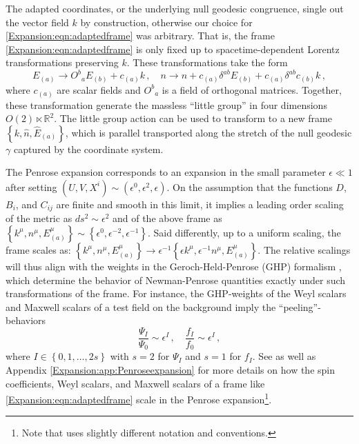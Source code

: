 The adapted coordinates, or the underlying null geodesic congruence, single out the vector field $k$ by construction, otherwise our choice for \eqref{Expansion:eqn:adaptedframe} was arbitrary. That is, the frame \eqref{Expansion:eqn:adaptedframe} is only fixed up to spacetime-dependent Lorentz transformations preserving $k$. These transformations take the form
\begin{equation}\label{Expansion:eqn:littlegroup}
E_{(a)} \to O^b{}_{a} E_{(b)} + c_{(a)} k \, , \quad n \to n + c_{(a)} \delta^{ab} E_{(b)} + c_{(a)}\delta^{ab} c_{(b)} k \, ,
\end{equation}
where $c_{(a)}$ are scalar fields and $O^b{}_{a}$ is a field of orthogonal matrices. Together, these transformation generate the massless ``little group'' in four dimensions $O(2) \ltimes \mathbb{R}^2$. The little group action can be used to transform to a new frame $\left\lbrace k, \hat{n},  \hat{E}_{(a)} \right\rbrace$, which is parallel transported along the stretch of the null geodesic $\gamma$ captured by the coordinate system.

The Penrose expansion corresponds to an expansion in the small parameter $\epsilon \ll 1$ after setting $(U,V,X^i) \sim (\epsilon^0, \epsilon^2, \epsilon)$. On the assumption that the functions $D$, $B_i$, and $C_{ij}$ are finite and smooth in this limit, it implies a leading order scaling of the metric as $ds^2 \sim \epsilon^2$ and of the above frame as $\left\lbrace k^{\mu}, n^{\mu},  E^{\mu}_{(a)} \right\rbrace \sim \left\lbrace \epsilon^0, \epsilon^{-2},  \epsilon^{-1} \right\rbrace $. Said differently, up to a uniform scaling, the frame scales as: $\left\lbrace k^{\mu}, n^{\mu},  E^{\mu}_{(a)} \right\rbrace \to \epsilon^{-1} \left\lbrace \epsilon k^{\mu}, \epsilon^{-1} n^{\mu},  E^{\mu}_{(a)} \right\rbrace $. The relative scalings will thus align with the weights in the Geroch-Held-Penrose (GHP) formalism \cite{geroch1973space}, which determine the behavior of Newman-Penrose quantities exactly under such transformations of the frame. For instance, the GHP-weights of the Weyl scalars and Maxwell scalars of a test field on the background imply the ``peeling''-behaviors 
\begin{equation}\label{Expansion:eqn:peeling}
\frac{\Psi_I}{\Psi_0} \sim \epsilon^I \, , \quad \frac{f_I}{f_0} \sim \epsilon^I \, ,
\end{equation}
where $I \in \left\lbrace 0,1, \ldots, 2s \right \rbrace$ with $s = 2$ for $\Psi_I$ and $s=1$ for $f_I$. See \cite{Kunze:2004qd} as well as Appendix \ref{Expansion:app:Penroseexpansion} for more details on how the spin coefficients, Weyl scalars, and Maxwell scalars of a frame like \eqref{Expansion:eqn:adaptedframe} scale in the Penrose expansion\footnote{Note that \cite{Kunze:2004qd} uses slightly different notation and conventions.}. 


